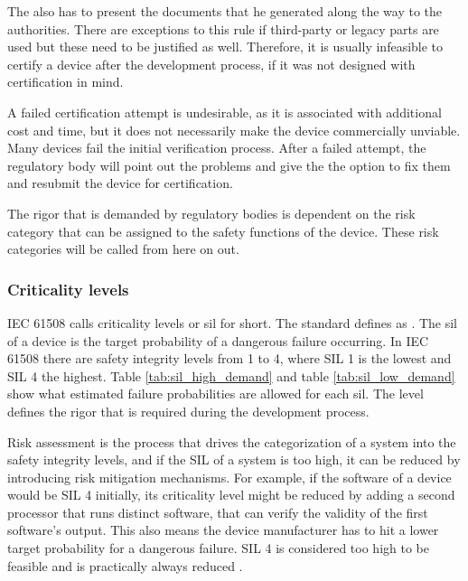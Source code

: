 The \mfg{} also has to present the documents that he generated along the way to the authorities. There are exceptions to this rule if third-party or legacy parts are used but these need to be justified as well. Therefore, it is usually infeasible to certify a device after the development process, if it was not designed with certification in mind. 

A failed certification attempt is undesirable, as it is associated with additional cost and time, but it does not necessarily make the device commercially unviable. Many devices fail the initial verification process. After a failed attempt, the regulatory body will point out the problems and give the \mfg{} the option to fix them and resubmit the device for certification.

The rigor that is demanded by regulatory bodies is dependent on the risk category that can be assigned to the safety functions of the device. These risk categories will be called  from here on out. 

\subsubsection{Criticality levels}
IEC 61508 calls criticality levels  or  \acrshort{sil} for short. The standard defines  as \cite{IEC.2000-1}. The \acrshort{sil} of a device is the target probability of a dangerous failure occurring. In IEC 61508 there are safety integrity levels from 1 to 4, where SIL 1 is the lowest and SIL 4 the highest. Table \ref{tab:sil_high_demand} and table \ref{tab:sil_low_demand} show what estimated failure probabilities are allowed for each \acrshort{sil}. The level defines the rigor that is required during the development process.

Risk assessment is the process that drives the categorization of a system into the safety integrity levels, and if the SIL of a system is too high, it can be reduced by introducing risk mitigation mechanisms. For example, if the software of a device would be SIL 4 initially, its criticality level might be reduced by adding a second processor that runs distinct software, that can verify the validity of the first software's output. This also means the device manufacturer has to hit a lower target probability for a dangerous failure.  SIL 4 is considered too high to be feasible and is practically always reduced \cite{MTL2002introduction}.

